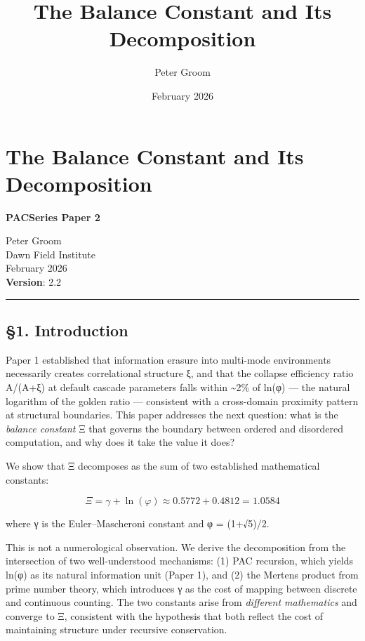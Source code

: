 \documentclass[
  11pt,
  a4paper]{article}
\title{The Balance Constant and Its Decomposition}
\author{Peter Groom}
\date{February 2026}
\begin{document}
\maketitle

\renewcommand*\contentsname{Contents}
{
\setcounter{tocdepth}{3}
\tableofcontents
}
\section{The Balance Constant and Its
Decomposition}\label{the-balance-constant-and-its-decomposition}

\textbf{PACSeries Paper 2}

Peter Groom\\
Dawn Field Institute\\
February 2026\\
\textbf{Version}: 2.2

\begin{center}\rule{0.5\linewidth}{0.5pt}\end{center}

\subsection{§1. Introduction}\label{introduction}

Paper 1 established that information erasure into multi-mode
environments necessarily creates correlational structure ξ, and that the
collapse efficiency ratio A/(A+ξ) at default cascade parameters falls
within \textasciitilde2\% of ln(φ) --- the natural logarithm of the
golden ratio --- consistent with a cross-domain proximity pattern at
structural boundaries. This paper addresses the next question: what is
the \emph{balance constant} Ξ that governs the boundary between ordered
and disordered computation, and why does it take the value it does?

We show that Ξ decomposes as the sum of two established mathematical
constants:

\[\Xi = \gamma + \ln(\varphi) \approx 0.5772 + 0.4812 = 1.0584\]

where γ is the Euler--Mascheroni constant and φ = (1+√5)/2.

This is not a numerological observation. We derive the decomposition
from the intersection of two well-understood mechanisms: (1) PAC
recursion, which yields ln(φ) as its natural information unit (Paper 1),
and (2) the Mertens product from prime number theory, which introduces γ
as the cost of mapping between discrete and continuous counting. The two
constants arise from \emph{different mathematics} and converge to Ξ,
consistent with the hypothesis that both reflect the cost of maintaining
structure under recursive conservation.
\end{document}
